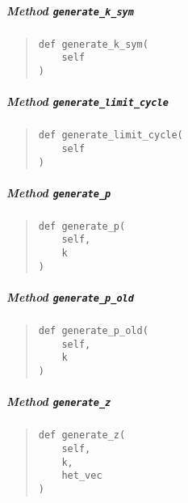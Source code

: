 \documentclass[
  english,
  a4paper,
  oneside]{article}
\begin{document}
\hypertarget{StrongCoupling.StrongCoupling.generate_k_sym}{%
\subparagraph{\texorpdfstring{Method
\texttt{generate\_k\_sym}}{Method generate\_k\_sym}}\label{StrongCoupling.StrongCoupling.generate_k_sym}}

\begin{quote}
\begin{verbatim}
def generate_k_sym(
    self
)
\end{verbatim}
\end{quote}

\hypertarget{StrongCoupling.StrongCoupling.generate_limit_cycle}{%
\subparagraph{\texorpdfstring{Method
\texttt{generate\_limit\_cycle}}{Method generate\_limit\_cycle}}\label{StrongCoupling.StrongCoupling.generate_limit_cycle}}

\begin{quote}
\begin{verbatim}
def generate_limit_cycle(
    self
)
\end{verbatim}
\end{quote}

\hypertarget{StrongCoupling.StrongCoupling.generate_p}{%
\subparagraph{\texorpdfstring{Method
\texttt{generate\_p}}{Method generate\_p}}\label{StrongCoupling.StrongCoupling.generate_p}}

\begin{quote}
\begin{verbatim}
def generate_p(
    self,
    k
)
\end{verbatim}
\end{quote}

\hypertarget{StrongCoupling.StrongCoupling.generate_p_old}{%
\subparagraph{\texorpdfstring{Method
\texttt{generate\_p\_old}}{Method generate\_p\_old}}\label{StrongCoupling.StrongCoupling.generate_p_old}}

\begin{quote}
\begin{verbatim}
def generate_p_old(
    self,
    k
)
\end{verbatim}
\end{quote}

\hypertarget{StrongCoupling.StrongCoupling.generate_z}{%
\subparagraph{\texorpdfstring{Method
\texttt{generate\_z}}{Method generate\_z}}\label{StrongCoupling.StrongCoupling.generate_z}}

\begin{quote}
\begin{verbatim}
def generate_z(
    self,
    k,
    het_vec
)
\end{verbatim}
\end{quote}
\end{document}
